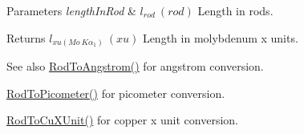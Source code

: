 \begin{DoxyParams}{Parameters}
{\em length\+In\+Rod} & $ l_{rod}\ (rod)$ Length in rods. \\
\hline
\end{DoxyParams}
\begin{DoxyReturn}{Returns}
$ l_{xu(Mo\ K\alpha_1)}\ (xu)$ Length in molybdenum x units. 
\end{DoxyReturn}
\begin{DoxySeeAlso}{See also}
\mbox{\hyperlink{group___e_g_x_math-_conversions-_length_conversions-_surveyors-_rod-_non-_s_i_ga079b9122c8747685d7057ec05fefdb7f}{Rod\+To\+Angstrom()}} for angstrom conversion. 

\mbox{\hyperlink{group___e_g_x_math-_conversions-_length_conversions-_surveyors-_rod-_s_i_ga212e66c6922a0df85714ec8559af8790}{Rod\+To\+Picometer()}} for picometer conversion. 

\mbox{\hyperlink{group___e_g_x_math-_conversions-_length_conversions-_surveyors-_rod-_non-_s_i_gac344dc1fbafaa0451704947bf33a8594}{Rod\+To\+Cu\+X\+Unit()}} for copper x unit conversion. 
\end{DoxySeeAlso}
